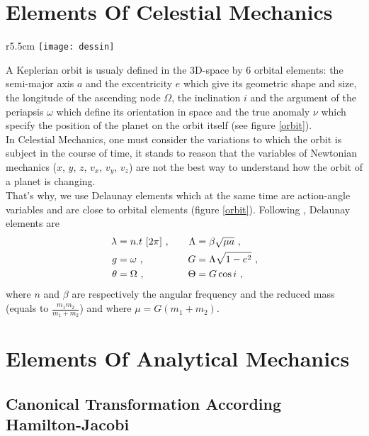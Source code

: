 \documentclass[a4paper]{article}
\begin{document}
\section{Elements Of Celestial Mechanics}
\label{orbitalelements}
\begin{wrapfigure}{r}{5.5cm}
\texttt{[image: dessin]}
\caption{Orbital Elements}\label{orbit}
\end{wrapfigure} 
A Keplerian orbit is usualy defined in the 3D-space by 6 orbital elements: the semi-major axis $a$ and the excentricity $e$ which give its geometric 
shape and size, the longitude of the ascending node $\Omega$, the inclination $i$ and the argument of the periapsis $\omega$ which define its orientation in space and the true anomaly $\nu$ which specify the position of the planet on the orbit itself (see figure \ref{orbit}). \\
In Celestial Mechanics, one must consider the variations to which the orbit is  subject in the course of time, it stands to reason that the variables of 
Newtonian mechanics ($x$, $y$, $z$, $v_{x}$, $v_{y}$, $v_{z}$) are not the best way to understand how the orbit of a planet is changing. \\
That's why, we use Delaunay elements which at the same time are action-angle variables and are close to orbital elements (figure \ref{orbit}). Following \cite{Boccaletti1}, Delaunay elements are
\begin{align}
\lambda&=n.t  \ [2\pi] \ ,  \quad &\Lambda&=\beta \sqrt{\mu a}  \ , \notag \\ 
g&=\omega   \ ,   \quad     &G&=\Lambda\sqrt{1-e^{2}} \ , \\
\theta&=\Omega  \ ,  \quad   &\Theta&=G\cos{i}  \ , \notag
\end{align}
where $n$ and $\beta$ are respectively the angular frequency and the reduced mass (equals to $\frac{m_{1}m_{2}}{m_{1}+m_{2}}$) and where $\mu=G(m_{1}+m_{2})$. 

\section{Elements Of Analytical Mechanics}
\label{eam}
\subsection{Canonical Transformation According Hamilton-Jacobi}
\end{document}
